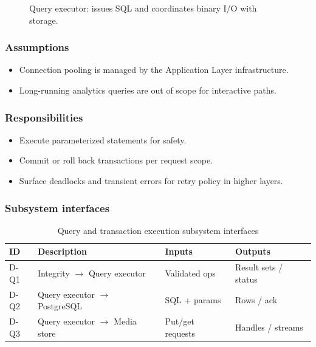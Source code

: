 \begin{figure}[H]
\centering
{}
\caption{Query executor: issues SQL and coordinates binary I/O with storage.}
\label{fig:data-query}
\end{figure}

\subsubsection{Assumptions}
\begin{itemize}
  \item Connection pooling is managed by the Application Layer infrastructure.
  \item Long-running analytics queries are out of scope for interactive paths.
\end{itemize}

\subsubsection{Responsibilities}
\begin{itemize}
  \item Execute parameterized statements for safety.
  \item Commit or roll back transactions per request scope.
  \item Surface deadlocks and transient errors for retry policy in higher layers.
\end{itemize}

\subsubsection{Subsystem interfaces}
\begin{table}[H]
\centering
\small
\begin{tabular}{|p{0.85cm}|p{3.5cm}|p{3.0cm}|p{3.5cm}|}
\hline
\textbf{ID} & \textbf{Description} & \textbf{Inputs} & \textbf{Outputs} \\
\hline
D-Q1 & Integrity $\rightarrow$ Query executor & Validated ops & Result sets / status \\
\hline
D-Q2 & Query executor $\rightarrow$ PostgreSQL & SQL + params & Rows / ack \\
\hline
D-Q3 & Query executor $\rightarrow$ Media store & Put/get requests & Handles / streams \\
\hline
\end{tabular}
\caption{Query and transaction execution subsystem interfaces}
\end{table}

